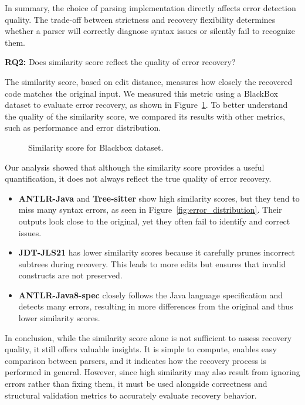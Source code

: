 \documentclass[conference]{IEEEtran}
\begin{document}
In summary, the choice of parsing implementation directly affects error detection quality. The trade-off between strictness and recovery flexibility determines whether a parser will correctly diagnose syntax issues or silently fail to recognize them. 

\textbf{RQ2:} Does similarity score reflect the quality of error recovery?  

The similarity score, based on edit distance, measures how closely the recovered code matches the original input. We measured this metric using a BlackBox dataset to evaluate error recovery, as shown in Figure~\ref{fig:sim}. To better understand the quality of the similarity score, we compared its results with other metrics, such as performance and error distribution. 

\begin{figure}[htbp]


\caption{Similarity score for Blackbox dataset.}\label{fig:sim}
\end{figure}

Our analysis showed that although the similarity score provides a useful quantification, it does not always reflect the true quality of error recovery.
\begin{itemize}
    \item \textbf{ANTLR-Java} and \textbf{Tree-sitter} show high similarity scores, but they tend to miss many syntax errors, as seen in Figure~\ref{fig:error_distribution}. Their outputs look close to the original, yet they often fail to identify and correct issues.
    
    \item \textbf{JDT-JLS21} has lower similarity scores because it carefully prunes incorrect subtrees during recovery. This leads to more edits but ensures that invalid constructs are not preserved.
    
    \item \textbf{ANTLR-Java8-spec} closely follows the Java language specification and detects many errors, resulting in more differences from the original and thus lower similarity scores.
\end{itemize}

In conclusion, while the similarity score alone is not sufficient to assess recovery quality, it still offers valuable insights. It is simple to compute, enables easy comparison between parsers, and it indicates how the recovery process is performed in general. However, since high similarity may also result from ignoring errors rather than fixing them, it must be used alongside correctness and structural validation metrics to accurately evaluate recovery behavior.
\end{document}
